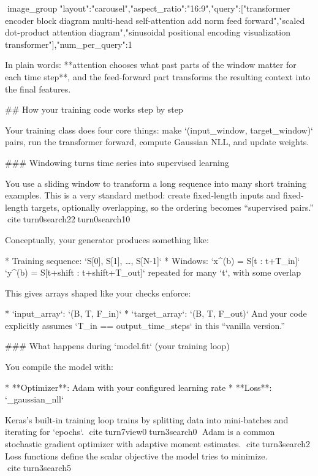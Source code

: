 \documentclass[a4paper]{article}
\begin{document}
    image_group{"layout":"carousel","aspect_ratio":"16:9","query":["transformer encoder block diagram multi-head self-attention add norm feed forward","scaled dot-product attention diagram","sinusoidal positional encoding visualization transformer"],"num_per_query":1}
    
    In plain words: **attention chooses what past parts of the window matter for each time step**, and the feed-forward part transforms the resulting context into the final features.
    
    ## How your training code works step by step
    
    Your training class does four core things: make `(input_window, target_window)` pairs, run the transformer forward, compute Gaussian NLL, and update weights.
    
    ### Windowing turns time series into supervised learning
    
    You use a sliding window to transform a long sequence into many short training examples. This is a very standard method: create fixed-length inputs and fixed-length targets, optionally overlapping, so the ordering becomes “supervised pairs.” citeturn0search22turn0search10
    
    Conceptually, your generator produces something like:
    
    * Training sequence: `S[0], S[1], …, S[N-1]`
    * Windows:
      `x^(b) = S[t : t+T_in]`
      `y^(b) = S[t+shift : t+shift+T_out]`
      repeated for many `t`, with some overlap
    
    This gives arrays shaped like your checks enforce:
    
    * `input_array`: `(B, T, F_in)`
    * `target_array`: `(B, T, F_out)`
    And your code explicitly assumes `T_in == output_time_steps` in this “vanilla version.”
    
    ### What happens during `model.fit` (your training loop)
    
    You compile the model with:
    
    * **Optimizer**: Adam with your configured learning rate
    * **Loss**: `_gaussian_nll`
    
    Keras’s built-in training loop trains by splitting data into mini-batches and iterating for `epochs`. citeturn7view0turn3search0
    Adam is a common stochastic gradient optimizer with adaptive moment estimates. citeturn3search2
    Loss functions define the scalar objective the model tries to minimize. citeturn3search5
    
\end{document}
